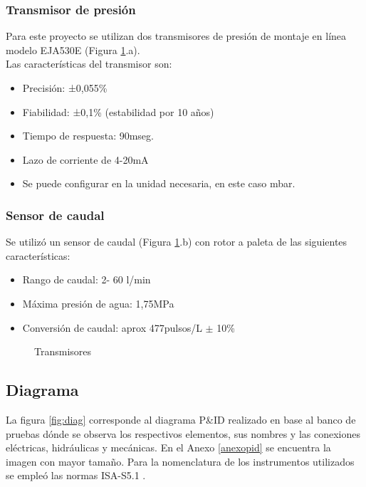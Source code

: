 \subsubsection{Transmisor de presión}
Para este proyecto se utilizan dos transmisores de presión de montaje en línea modelo EJA530E (Figura \ref{fig:transd}.a).\\
Las características del transmisor son:
\begin{itemize}
	\item Precisión: ±0,055\% 
	\item Fiabilidad: ±0,1\% (estabilidad por 10 años)
	\item Tiempo de respuesta: 90mseg.
	\item Lazo de corriente de 4-20mA
	\item Se puede configurar en la unidad necesaria, en este caso mbar.
\end{itemize}


\subsubsection{Sensor de caudal}
Se utilizó un sensor de caudal (Figura \ref{fig:transd}.b) con rotor a paleta de las siguientes características:
\begin{itemize}
	\item Rango de caudal: 2- 60 l/min
	\item Máxima presión de agua: 1,75MPa
	\item Conversión de caudal: aprox 477pulsos/L $\pm$ 10\%
\end{itemize}


\begin{figure}[h!]
	\centering
	\caption{Transmisores} \label{fig:transd}
\end{figure}





\subsection{Diagrama}
La figura \ref{fig:diag} corresponde al diagrama P\&ID realizado en base al banco de pruebas dónde se observa los respectivos elementos, sus nombres y las conexiones eléctricas, hidráulicas y mecánicas. En el Anexo \ref{anexopid} se encuentra la imagen con mayor tamaño.
 Para la nomenclatura de los instrumentos utilizados se empleó las normas ISA-S5.1 \cite{ISA}. 

